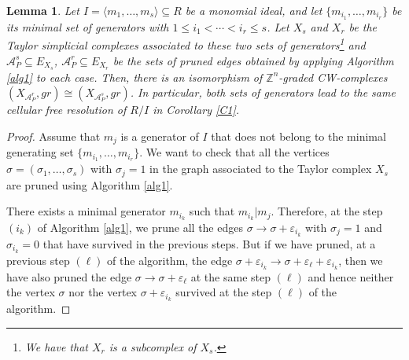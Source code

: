 \documentclass[12pt]{amsart}
\newtheorem{lemma}[theorem]{Lemma}
\theoremstyle{definition}
\theoremstyle{remark}
\numberwithin{equation}{section}
\newcommand{\bZ}{{\mathbb{Z}}}
\newcommand{\cA}{{\mathcal A}}
\newcommand{\lra}{{\longrightarrow}}
\newcommand{\phil}[1]{{\color{red} \sf $\star\star$ Philippe: [#1]}}
\begin{document}
\vskip 2mm

\begin{lemma}\label{minimal}
Let $I =\langle m_1,\dots, m_s \rangle \subseteq R$ be a monomial
ideal, and let $\{m_{i_1},\dots, m_{i_r} \}$ be its minimal set of generators
with $1\leq {i_1} < \cdots < {i_r} \leq s$.
Let $X_s$ and $X_r$
be the Taylor simplicial complexes associated to these two sets of
generators\footnote{We have that $X_r$ is a
subcomplex of $X_s$.} and  $\cA_P^s \subseteq E_{X_s}$, $\cA_P^r \subseteq
E_{X_r}$ be  the sets of pruned edges obtained by applying Algorithm
\ref{alg1} to each case. Then, there is an isomorphism of
$\bZ^n$-graded CW-complexes $(X_{\cA_P^r},gr) \cong
(X_{\cA_P^s},gr)$. In particular, both sets of generators lead to
the same cellular free resolution of $R/I$ in Corollary \ref{C1}.
\end{lemma}

\begin{proof}

Assume that $m_j$ %
is a generator of $I$ that does not belong to the minimal generating set $\{m_{i_1},\dots,
m_{i_r} \}$. We want to check that all the vertices
$\sigma=(\sigma_1,\dots,\sigma_s)$ with $\sigma_j=1$ in the graph
associated to the Taylor complex $X_s$ are pruned using Algorithm
\ref{alg1}.

\vskip 2mm

There exists a minimal generator $m_{i_k}$ such that $m_{i_k} |
m_j$. Therefore, at the step $(i_k)$ of Algorithm \ref{alg1}, we
prune all the edges $\sigma \lra \sigma + \varepsilon_{i_k}$
with $\sigma_j=1$ and $\sigma_{i_k}=0$
that have survived in the previous steps. But if we have pruned,
at a previous step $(\ell)$ of the algorithm, the edge $\sigma
+\varepsilon_{i_k} \lra \sigma + \varepsilon_\ell
+\varepsilon_{i_k}$, then we have also pruned the edge $\sigma  \lra
\sigma + \varepsilon_\ell $ at the same step $(\ell)$ and hence neither the vertex $\sigma$ nor the vertex $\sigma + \varepsilon_{i_k}$
survived at the step $(\ell)$ of the algorithm.
\end{proof}
\end{document}
